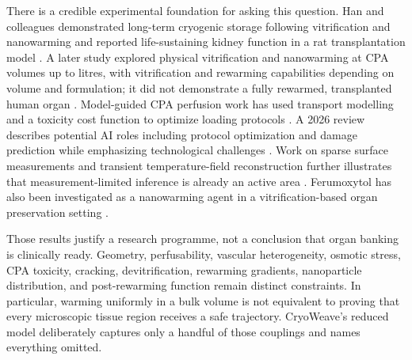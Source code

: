 \documentclass[11pt]{article}
\begin{document}
There is a credible experimental foundation for asking this question. Han and colleagues demonstrated long-term cryogenic storage following vitrification and nanowarming and reported life-sustaining kidney function in a rat transplantation model \cite{Han2023}. A later study explored physical vitrification and nanowarming at CPA volumes up to litres, with vitrification and rewarming capabilities depending on volume and formulation; it did not demonstrate a fully rewarmed, transplanted human organ \cite{Gangwar2025}. Model-guided CPA perfusion work has used transport modelling and a toxicity cost function to optimize loading protocols \cite{HanPerfusion2023}. A 2026 review describes potential AI roles including protocol optimization and damage prediction while emphasizing technological challenges \cite{LeiAI2026}. Work on sparse surface measurements and transient temperature-field reconstruction further illustrates that measurement-limited inference is already an active area \cite{SunTemp2026}. Ferumoxytol has also been investigated as a nanowarming agent in a vitrification-based organ preservation setting \cite{FengFerumoxytol2026}.

Those results justify a research programme, not a conclusion that organ banking is clinically ready. Geometry, perfusability, vascular heterogeneity, osmotic stress, CPA toxicity, cracking, devitrification, rewarming gradients, nanoparticle distribution, and post-rewarming function remain distinct constraints. In particular, warming uniformly in a bulk volume is not equivalent to proving that every microscopic tissue region receives a safe trajectory. CryoWeave's reduced model deliberately captures only a handful of those couplings and names everything omitted.
\end{document}
